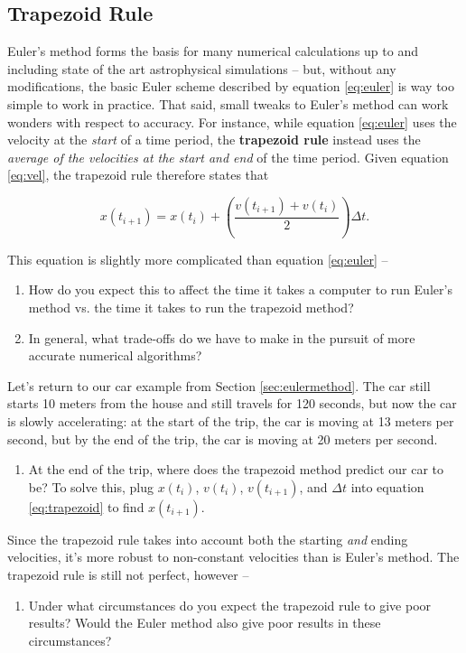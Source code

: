\documentclass[11pt]{article}
\begin{document}
\subsection{Trapezoid Rule}
Euler's method forms the basis for many numerical calculations up to and including state of the art astrophysical simulations -- but, without any modifications, the basic Euler scheme described by equation \ref{eq:euler} is way too simple to work in practice. That said, small tweaks to Euler's method can work wonders with respect to accuracy. For instance, while equation \ref{eq:euler} uses the velocity at the \emph{start} of a time period, the \textbf{trapezoid rule} instead uses the \emph{average of the velocities at the start and end} of the time period. Given equation \ref{eq:vel}, the trapezoid rule therefore states that

\begin{equation} \label{eq:trapezoid}
\boxed{x(t_{i+1}) = x(t_i) + \left(\frac{v(t_{i+1}) + v(t_i)}{2}\right) \Delta t}.
\end{equation}

This equation is slightly more complicated than equation \ref{eq:euler} -- 
\begin{enumerate}[resume]
    \item How do you expect this to affect the time it takes a computer to run Euler's method vs. the time it takes to run the trapezoid method? 
    
    \item In general, what trade-offs do we have to make in the pursuit of more accurate numerical algorithms?
\end{enumerate}

\noindent
Let's return to our car example from Section \ref{sec:eulermethod}. The car still starts 10 meters from the house and still travels for 120 seconds, but now the car is slowly accelerating: at the start of the trip, the car is moving at 13 meters per second, but by the end of the trip, the car is moving at 20 meters per second.
\begin{enumerate}[resume]
    \item At the end of the trip, where does the trapezoid method predict our car to be? To solve this, plug $x(t_i)$, $v(t_i)$, $v(t_{i+1})$, and $\Delta t$ into equation \ref{eq:trapezoid} to find $x(t_{i+1})$.
\end{enumerate}

\noindent
Since the trapezoid rule takes into account both the starting \textit{and} ending velocities, it's more robust to non-constant velocities than is Euler's method. The trapezoid rule is still not perfect, however -- 
\begin{enumerate}[resume]
    \item Under what circumstances do you expect the trapezoid rule to give poor results? Would the Euler method also give poor results in these circumstances?
\end{enumerate}
\end{document}
